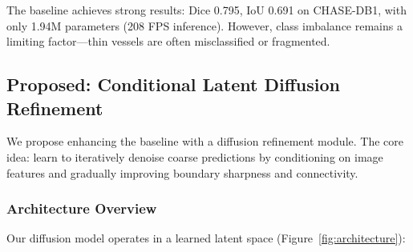 \documentclass[11pt]{article}
\begin{document}
The baseline achieves strong results: Dice 0.795, IoU 0.691 on CHASE-DB1, with only 1.94M parameters (208 FPS inference). However, class imbalance remains a limiting factor—thin vessels are often misclassified or fragmented.

\subsection{Proposed: Conditional Latent Diffusion Refinement}

We propose enhancing the baseline with a diffusion refinement module. The core idea: learn to iteratively denoise coarse predictions by conditioning on image features and gradually improving boundary sharpness and connectivity.

\subsubsection{Architecture Overview}

Our diffusion model operates in a learned latent space (Figure~\ref{fig:architecture}):
\end{document}
